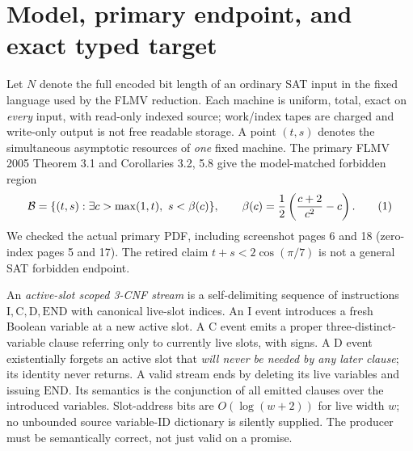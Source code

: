 \documentclass[11pt]{article}
\begin{document}
\section{Model, primary endpoint, and exact typed target}
Let $N$ denote the full encoded bit length of an ordinary SAT input in the fixed language used by the FLMV reduction. Each machine is uniform, total, exact on \emph{every} input, with read-only indexed source; work/index tapes are charged and write-only output is not free readable storage. A point $(t,s)$ denotes the simultaneous asymptotic resources of \emph{one} fixed machine. The primary FLMV 2005 Theorem 3.1 and Corollaries 3.2, 5.8 give the model-matched forbidden region
\[
 {\cal B}=\{(t,s):\exists c>\max(1,t),\
  s<\beta(c)\},\qquad
 \beta(c)=\frac12\left(\frac{c+2}{c^2}-c\right).
 \tag{1}
\]
We checked the actual primary PDF, including screenshot pages 6 and 18 (zero-index pages 5 and 17). The retired claim $t+s<2\cos(\pi/7)$ is not a general SAT forbidden endpoint.

An \emph{active-slot scoped 3-CNF stream} is a self-delimiting sequence of instructions $\mathrm{I},\mathrm{C},\mathrm{D},\mathrm{END}$ with canonical live-slot indices. An $\mathrm{I}$ event introduces a fresh Boolean variable at a new active slot. A $\mathrm{C}$ event emits a proper three-distinct-variable clause referring only to currently live slots, with signs. A $\mathrm{D}$ event existentially forgets an active slot that \emph{will never be needed by any later clause}; its identity never returns. A valid stream ends by deleting its live variables and issuing $\mathrm{END}$. Its semantics is the conjunction of all emitted clauses over the introduced variables. Slot-address bits are $O(\log(w+2))$ for live width $w$; no unbounded source variable-ID dictionary is silently supplied. The producer must be semantically correct, not just valid on a promise.
\end{document}
